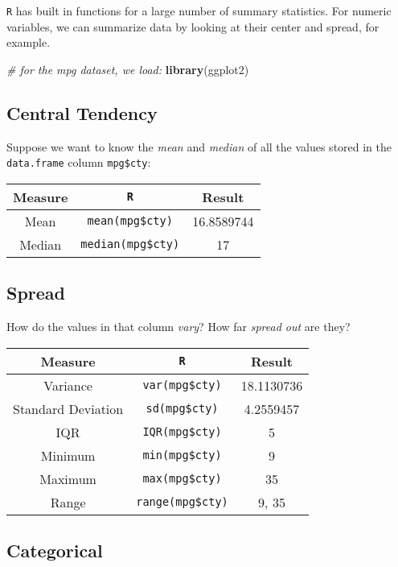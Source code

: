\documentclass[]{book}
\newenvironment{Shaded}{\begin{snugshade}}{\end{snugshade}}
\newcommand{\KeywordTok}[1]{\textcolor[rgb]{0.13,0.29,0.53}{\textbf{#1}}}
\newcommand{\CommentTok}[1]{\textcolor[rgb]{0.56,0.35,0.01}{\textit{#1}}}
\newcommand{\NormalTok}[1]{#1}
\begin{document}
\texttt{R} has built in functions for a large number of summary
statistics. For numeric variables, we can summarize data by looking at
their center and spread, for example.

\begin{Shaded}
\begin{Highlighting}[]
\CommentTok{# for the mpg dataset, we load:}
\KeywordTok{library}\NormalTok{(ggplot2)}
\end{Highlighting}
\end{Shaded}

\subsection*{Central Tendency}\label{central-tendency}

Suppose we want to know the \emph{mean} and \emph{median} of all the
values stored in the \texttt{data.frame} column \texttt{mpg\$cty}:

\begin{longtable}[]{@{}ccc@{}}
\toprule
Measure & \texttt{R} & Result\tabularnewline
\midrule
\endhead
Mean & \texttt{mean(mpg\$cty)} & 16.8589744\tabularnewline
Median & \texttt{median(mpg\$cty)} & 17\tabularnewline
\bottomrule
\end{longtable}

\subsection*{Spread}\label{spread}

How do the values in that column \emph{vary}? How far \emph{spread out}
are they?

\begin{longtable}[]{@{}ccc@{}}
\toprule
Measure & \texttt{R} & Result\tabularnewline
\midrule
\endhead
Variance & \texttt{var(mpg\$cty)} & 18.1130736\tabularnewline
Standard Deviation & \texttt{sd(mpg\$cty)} & 4.2559457\tabularnewline
IQR & \texttt{IQR(mpg\$cty)} & 5\tabularnewline
Minimum & \texttt{min(mpg\$cty)} & 9\tabularnewline
Maximum & \texttt{max(mpg\$cty)} & 35\tabularnewline
Range & \texttt{range(mpg\$cty)} & 9, 35\tabularnewline
\bottomrule
\end{longtable}

\subsection*{Categorical}\label{categorical}
\end{document}
